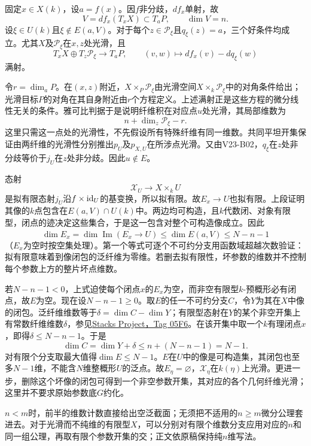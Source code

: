 固定$x\in X(k)$，设$a=f(x)$。因$f$非分歧，$df_x$单射，故
\[
V=df_x(T_xX)\subset T_aP,\qquad \dim V=n.
\]
设$\xi\in U(k)$且$\xi\notin E(a,V)$。对于每个$z\in\mathcal P_\xi$且$q_\xi(z)=a$，三个好条件均成立。尤其$X$及$\mathcal P_\xi$在$x,z$处光滑，且
\[
T_xX\oplus T_z\mathcal P_\xi\longrightarrow T_aP,
\qquad(v,w)\longmapsto df_x(v)-dq_\xi(w)
\]
满射。

令$r=\dim_aP$。在$(x,z)$附近，$X\times_P\mathcal P_\xi$由光滑空间$X\times_k\mathcal P_\xi$中的对角条件给出；光滑目标$P$的对角在其自身附近由$r$个方程定义。上述满射正是这些方程的微分线性无关的条件。雅可比判据于是说明纤维积在对应点$u$处光滑，其局部维数为
\[
n+\dim_z\mathcal P_\xi-r.
\]
这里只需这一点处的光滑性，不先假设所有特殊纤维有同一维数。共同平坦开集保证由两纤维的光滑性分别推出$p_U$及$p_{X,U}$在所涉点光滑。又由V23-B02，$q_\xi$在$z$处非分歧等价于$j_U$在$z$处非分歧。因此$u\notin E$。

态射
\[
\mathcal X_U\longrightarrow X\times_kU
\]
是拟有限态射$j_U$沿$f\times\mathrm{id}_U$的基变换，所以拟有限。故$E_x\to U$也拟有限。上段证明其像的$k$点包含在$E(a,V)\cap U(k)$中。两边均可构造，且$k$代数闭、对象有限型，闭点的迹决定这些集合，于是这一包含对整个可构造像成立。因此
\[
\dim E_x=\dim \overline{\operatorname{Im}(E_x\to U)}
\leq\dim E(a,V)\leq N-n-1
\]
（$E_x$为空时按空集处理）。第一个等式可逐个不可约分支用函数域超越次数验证：拟有限意味着到像闭包的泛纤维为零维。若删去拟有限性，坏参数的维数并不控制每个参数上方的整片坏点维数。

若$N-n-1<0$，上式迫使每个闭点$x$的$E_x$为空，而非空有限型$k$-预概形必有闭点，故$E$为空。现在设$N-n-1\geq0$。取$E$的任一不可约分支$C$，令$Y$为其在$X$中像的闭包。泛纤维维数等于$\delta=\dim C-\dim Y$；有限型态射在$Y$的某个非空开集上有常数纤维维数$\delta$，参见\href{https://stacks.math.columbia.edu/tag/05F6}{Stacks Project，Tag 05F6}。在该开集中取一个$k$有理闭点$x$，即得$\delta\leq N-n-1$。于是
\[
\dim C=\dim Y+\delta\leq n+(N-n-1)=N-1.
\]
对有限个分支取最大值得$\dim E\leq N-1$。$E$在$U$中的像是可构造集，其闭包也至多$N-1$维，不能含$N$维整概形$U$的泛点。故$E_\eta=\varnothing$，$\mathcal X_\eta$在$k(\eta)$上光滑。更进一步，删除这个坏像的闭包可得到一个非空参数开集，其对应的各个几何纤维光滑；这里并不要求原始参数底$G$约化。

$n<m$时，前半的维数计数直接给出空泛截面；无须把不适用的$n\geq m$微分公理套进去。对于光滑而不纯维的有限型$X$，可以分别对有限个维数分支应用对应的$n$和同一组公理，再取有限个参数开集的交；正文依原稿保持纯$n$维写法。

